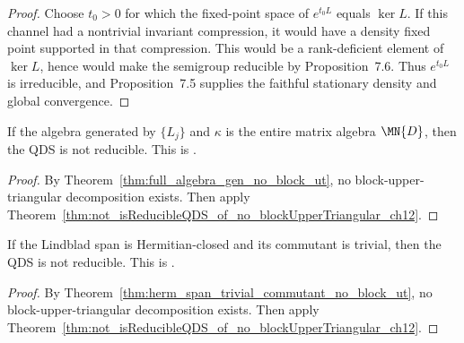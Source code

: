 \begin{proof}\leanok
    Choose $t_0>0$ for which the fixed-point space of $e^{t_0L}$ equals
    $\ker L$.  If this channel had a nontrivial invariant compression, it
    would have a density fixed point supported in that compression.  This
    would be a rank-deficient element of $\ker L$, hence would make the
    semigroup reducible by Proposition~7.6.  Thus $e^{t_0L}$ is irreducible,
    and Proposition~7.5 supplies the faithful stationary density and global
    convergence.
\end{proof}

\begin{theorem}
    \label{thm:not_isReducible_of_generates_full_algebra}
    \leanok
    If the algebra generated by $\{L_j\}$ and $\kappa$ is the entire
    matrix algebra $\MN{D}$, then the QDS is not reducible.
    This is \cite[Corollary~7.2(1)]{Wolf2012Quantum}.
\end{theorem}

\begin{proof}\leanok
    By Theorem~\ref{thm:full_algebra_gen_no_block_ut}, no block-upper-triangular
    decomposition exists. Then apply
    Theorem~\ref{thm:not_isReducibleQDS_of_no_blockUpperTriangular_ch12}.
\end{proof}

\begin{theorem}
    \label{thm:not_isReducible_of_hermitian_span_trivial_commutant}
    \leanok
    If the Lindblad span is Hermitian-closed and its commutant is trivial,
    then the QDS is not reducible.
    This is \cite[Corollary~7.2(2)]{Wolf2012Quantum}.
\end{theorem}

\begin{proof}\leanok
    By Theorem~\ref{thm:herm_span_trivial_commutant_no_block_ut}, no
    block-upper-triangular decomposition exists. Then apply
    Theorem~\ref{thm:not_isReducibleQDS_of_no_blockUpperTriangular_ch12}.
\end{proof}

